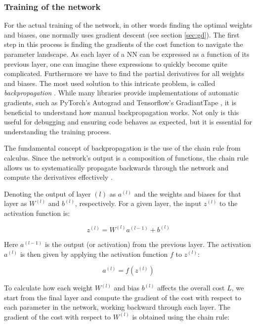 \subsubsection{Training of the network}
For the actual training of the network, in other words finding the optimal weights and biases, one normally uses gradient descent (see section \ref{sec:gd}). The first step in this process is finding the gradients of the cost function to navigate the parameter landscape. As each layer of a NN can be expressed as a function of its previous layer, one can imagine these expressions to quickly become quite complicated. Furthermore we have to find the partial derivatives for all weights and biases. The most used solution to this intricate problem, is called \textit{backpropagation} \citep[p. 200]{Goodfellow-et-al-2016}. While many libraries provide implementations of automatic gradients, such as PyTorch's Autograd \cite{Ansel_PyTorch_2_Faster_2024} and Tensorflow's GradiantTape \cite{Abadi_TensorFlow_Large-scale_machine_2015}, it is beneficial to understand how manual backpropagation works. Not only is this useful for debugging and ensuring code behaves as expected, but it is essential for understanding the training process. 

The fundamental concept of backpropagation is the use of the chain rule from calculus. Since the network's output is a composition of functions, the chain rule allows us to systematically propagate backwards through the network and compute the derivatives effectively \citep[Ch.2]{nielsen}. 

Denoting the output of layer $(l)$ as $ a^{(l)}$ and the weights and biases for that layer as $W^{(l)}$ and $b^{(l)}$, respectively. For a given layer, the input $z^{(l)}$ to the activation function is:

\begin{equation}
z^{(l)} = W^{(l)} a^{(l-1)} + b^{(l)}
\end{equation}

Here $a^{(l-1)}$ is the output (or activation) from the previous layer. The activation \( a^{(l)} \) is then given by applying the activation function $f$ to $z^{(l)}$:

\begin{equation}
a^{(l)} = f(z^{(l)})
\end{equation}

To calculate how each weight $ W^{(l)}$ and bias $b^{(l)}$ affects the overall cost $L$, we start from the final layer and compute the gradient of the cost with respect to each parameter in the network, working backward through each layer. The gradient of the cost with respect to $W^{(l)}$ is obtained using the chain rule:

